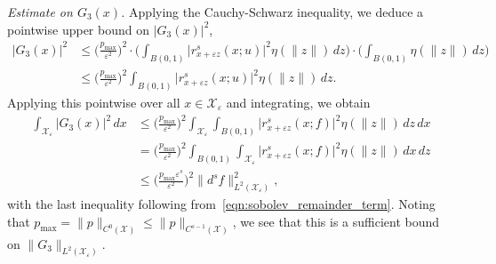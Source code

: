 \documentclass[aos]{imsart}
\theoremstyle{plain}
\theoremstyle{definition}
\theoremstyle{remark}
\newcommand{\mc}[1]{\mathcal{#1}}
\newcommand{\1}{\mathbf{1}}
\begin{document}
\emph{Estimate on $G_3(x)$.}
Applying the Cauchy-Schwarz inequality, we deduce a pointwise upper bound on $|G_3(x)|^2$,
\begin{align*}
|G_3(x)|^2 & \leq \biggl(\frac{p_{\max}}{\varepsilon^2}\biggr)^2 \cdot \biggl(\int_{B(0,1)} \bigl|r_{x + \varepsilon z}^s(x;u)\bigr|^2 \eta(\|z\|)\,dz\biggr) \cdot \biggl(\int_{B(0,1)} \eta(\|z\|) \,dz\biggr) \\
& \leq \biggl(\frac{p_{\max}}{\varepsilon^2}\biggr)^2 \int_{B(0,1)} \bigl|r_{x + \varepsilon z}^s(x;u)\bigr|^2 \eta(\|z\|) \,dz.
\end{align*}
Applying this pointwise over all $x \in \mc{X}_{\varepsilon}$ and integrating, we obtain
\begin{align*}
\int_{\mc{X}_{\varepsilon}} |G_3(x)|^2 \,dx & \leq \biggl(\frac{p_{\max}}{\varepsilon^2}\biggr)^2 \int_{\mc{X}_{\varepsilon}} \int_{B(0,1)} \bigl|r_{x + \varepsilon z}^s(x;f)\bigr|^2 \eta(\|z\|) \,dz \,dx \\
& = \biggl(\frac{p_{\max}}{\varepsilon^2}\biggr)^2 \int_{B(0,1)} \int_{\mc{X}_{\varepsilon}} \bigl|r_{x + \varepsilon z}^s(x;f)\bigr|^2 \eta(\|z\|) \,dx \,dz \\
& \leq \biggl(\frac{p_{\max}\varepsilon^s}{\varepsilon^2}\biggr)^2  \|d^sf\|_{L^2(\mc{X}_{\varepsilon})}^2,
\end{align*}
with the last inequality following from~\eqref{eqn:sobolev_remainder_term}. Noting that $p_{\max} = \|p\|_{C^0(\mc{X})} \leq \|p\|_{C^{s - 1}(\mc{X})}$, we see that this is a sufficient bound on $\|G_3\|_{L^2(\mc{X}_{\varepsilon})}$.
\end{document}
